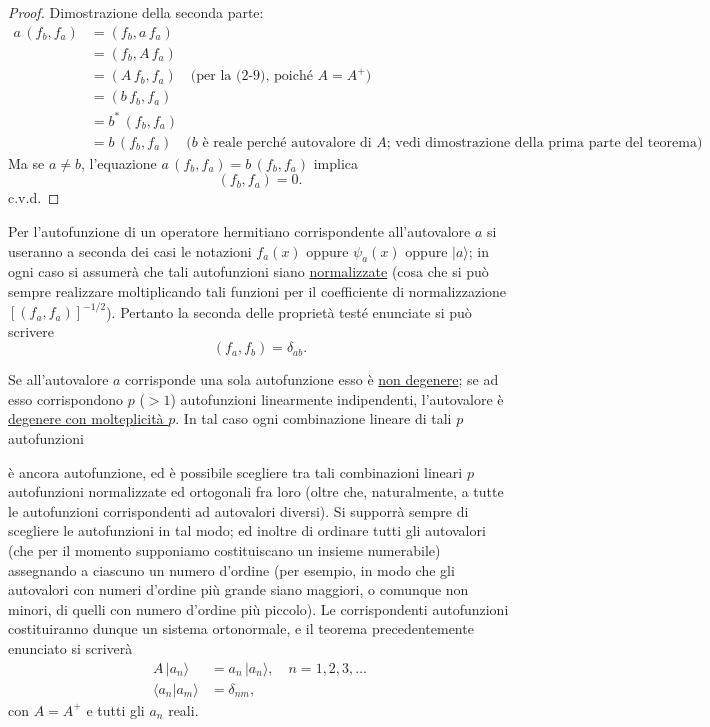 \documentclass[11pt, a4paper]{book}
\numberwithin{equation}{section}
\begin{document}
\begin{proof}
Dimostrazione della seconda parte:
\begin{align*}
a\,(f_b, f_a) &= (f_b, a\,f_a) \\
  &= (f_b, A\,f_a) \\
  &= (A\,f_b, f_a) \quad \text{(per la (2-9), poiché }A=A^+\text{)} \\
  &= (b\,f_b, f_a) \\
  &= b^*\,(f_b, f_a) \\
  &= b\,(f_b, f_a) \quad \text{($b$ è reale perché autovalore di $A$;
    vedi dimostrazione della prima parte del teorema)}.
\end{align*}
Ma se $a \neq b$, l'equazione $a\,(f_b, f_a) = b\,(f_b, f_a)$ implica
\[
(f_b, f_a) = 0.
\]
c.v.d.
\end{proof}

Per l'autofunzione di un operatore hermitiano corrispondente all'autovalore
$a$ si useranno a seconda dei casi le notazioni $f_a(x)$ oppure
$\psi_a(x)$ oppure $|a\rangle$; in ogni caso si assumerà che tali
autofunzioni siano \uline{normalizzate} (cosa che si può sempre
realizzare moltiplicando tali funzioni per il coefficiente di
normalizzazione $[(f_a, f_a)]^{-1/2}$). Pertanto la seconda delle
proprietà testé enunciate si può scrivere
\begin{equation}
(f_a, f_b) = \delta_{ab}.
\end{equation}

Se all'autovalore $a$ corrisponde una sola autofunzione esso è
\uline{non degenere}; se ad esso corrispondono $p$ ($>1$) autofunzioni
linearmente indipendenti, l'autovalore è \uline{degenere con
molteplicità $p$}. In tal caso ogni combinazione lineare di tali $p$
autofunzioni


è ancora autofunzione, ed è possibile scegliere tra tali combinazioni
lineari $p$ autofunzioni normalizzate ed ortogonali fra loro (oltre che,
naturalmente, a tutte le autofunzioni corrispondenti ad autovalori
diversi). Si supporrà sempre di scegliere le autofunzioni in tal modo; ed
inoltre di ordinare tutti gli autovalori (che per il momento supponiamo
costituiscano un insieme numerabile) assegnando a ciascuno un numero
d'ordine (per esempio, in modo che gli autovalori con numeri d'ordine più
grande siano maggiori, o comunque non minori, di quelli con numero
d'ordine più piccolo). Le corrispondenti autofunzioni costituiranno dunque
un sistema ortonormale, e il teorema precedentemente enunciato si scriverà
\begin{align}
A\,|a_n\rangle &= a_n\,|a_n\rangle, \quad n=1,2,3,\ldots \tag{3} \\
\langle a_n|a_m\rangle &= \delta_{nm}, \tag{4}
\end{align}
con $A=A^+$ e tutti gli $a_n$ reali.
\end{document}
